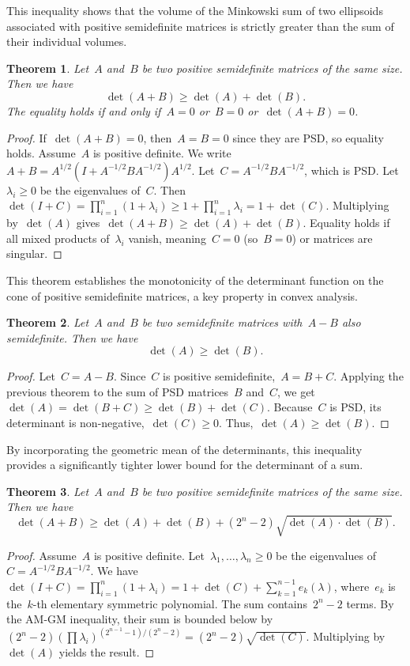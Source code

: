 \documentclass[12pt]{article}
\newtheorem{theorem}{Theorem}[section]
\begin{document}
\noindent This inequality shows that the volume of the Minkowski sum of two ellipsoids associated with positive semidefinite matrices is strictly greater than the sum of their individual volumes.
\begin{theorem}
Let~$A$ and~$B$ be two positive semidefinite matrices of the same size. Then we have
\[ \det(A + B) \ge \det(A) + \det(B). \]
The equality holds if and only if~$A = 0$ or~$B = 0$ or~$\det(A + B) = 0$.
\end{theorem}
\begin{proof}
If~$\det(A+B)=0$, then~$A=B=0$ since they are PSD, so equality holds. Assume~$A$ is positive definite. We write~$A + B = A^{1/2}(I + A^{-1/2}BA^{-1/2})A^{1/2}$. Let~$C = A^{-1/2}BA^{-1/2}$, which is PSD. Let~$\lambda_i \ge 0$ be the eigenvalues of~$C$. Then~$\det(I + C) = \prod_{i=1}^n (1 + \lambda_i) \ge 1 + \prod_{i=1}^n \lambda_i = 1 + \det(C)$. Multiplying by~$\det(A)$ gives~$\det(A+B) \ge \det(A) + \det(B)$. Equality holds if all mixed products of~$\lambda_i$ vanish, meaning~$C=0$ (so~$B=0$) or matrices are singular.
\end{proof}

\noindent This theorem establishes the monotonicity of the determinant function on the cone of positive semidefinite matrices, a key property in convex analysis.
\begin{theorem}
Let~$A$ and~$B$ be two semidefinite matrices with~$A - B$ also semidefinite. Then we have
\[ \det(A) \ge \det(B). \]
\end{theorem}
\begin{proof}
Let~$C = A - B$. Since~$C$ is positive semidefinite,~$A = B + C$. Applying the previous theorem to the sum of PSD matrices~$B$ and~$C$, we get~$\det(A) = \det(B + C) \ge \det(B) + \det(C)$. Because~$C$ is PSD, its determinant is non-negative,~$\det(C) \ge 0$. Thus,~$\det(A) \ge \det(B)$.
\end{proof}

\noindent By incorporating the geometric mean of the determinants, this inequality provides a significantly tighter lower bound for the determinant of a sum.
\begin{theorem}
Let~$A$ and~$B$ be two positive semidefinite matrices of the same size. Then we have
\[ \det(A + B) \ge \det(A) + \det(B) + (2^n - 2)\sqrt{\det(A) \cdot \det(B)}. \]
\end{theorem}
\begin{proof}
Assume~$A$ is positive definite. Let~$\lambda_1, \dots, \lambda_n \ge 0$ be the eigenvalues of~$C = A^{-1/2}BA^{-1/2}$. We have~$\det(I+C) = \prod_{i=1}^n (1+\lambda_i) = 1 + \det(C) + \sum_{k=1}^{n-1} e_k(\lambda)$, where~$e_k$ is the~$k$-th elementary symmetric polynomial. The sum contains~$2^n - 2$ terms. By the AM-GM inequality, their sum is bounded below by~$(2^n - 2) (\prod \lambda_i)^{(2^{n-1}-1)/(2^n-2)} = (2^n - 2)\sqrt{\det(C)}$. Multiplying by~$\det(A)$ yields the result.
\end{proof}
\end{document}
